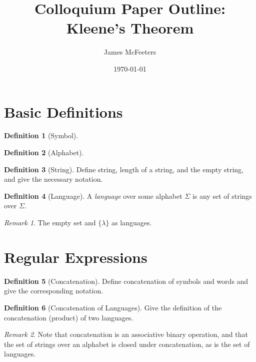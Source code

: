 \documentclass[12 pt, twoside, letterpaper]{article}
\title{Colloquium Paper Outline: \\[1 ex] Kleene's Theorem}
\author{James McFeeters}
\date{\today}
\newcommand{\meo}[1]{\texttt{#1}}
\renewcommand{\meo}[1]{\iffalse #1 \fi}
\theoremstyle{definition}
\newtheorem{definition}{Definition}
\theoremstyle{remark}
\newtheorem*{remark}{Remark}
\theoremstyle{plain}
\begin{document}
\maketitle



\section{Basic Definitions} %
\label{sec:basic_definitions}

	\begin{definition}[Symbol]
		
	\end{definition}

	\begin{definition}[Alphabet]

	\end{definition}

	\begin{definition}[String]
		Define string, length of a string, and the empty string, and give the necessary notation.
	\end{definition}

	\begin{definition}[Language]
		A \textit{language} over some alphabet $\Sigma$ is any set of strings over $\Sigma$.
	\end{definition}

	\begin{remark}
		The empty set and $\{ \lambda \}$ as languages.
	\end{remark}

\section{Regular Expressions} %
\label{sec:regular_expressions}
	
	\begin{definition}[Concatenation]
		Define concatenation of symbols and words and give the corresponding notation.
		\meo{
			Make sure to include the notation $x^i$ and $x^0$.
		}
	\end{definition}

	\begin{definition}[Concatenation of Languages]
		Give the definition of the concatenation (product) of two languages.
	\end{definition}

	\begin{remark}
		Note that concatenation is an associative binary operation, and that the set of strings over an alphabet is closed under concatenation, as is the set of languages.
		\meo{
			Maybe also note that length has the properties of the logarithm with regard to concatenation.
			It's a curiosity, but not really useful information
		}
	\end{remark}
\end{document}
